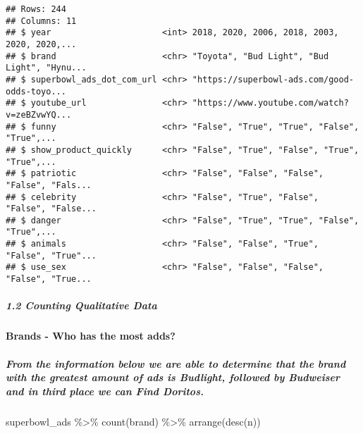 \documentclass[
]{article}
\newenvironment{Shaded}{\begin{snugshade}}{\end{snugshade}}
\newcommand{\FunctionTok}[1]{\textcolor[rgb]{0.00,0.00,0.00}{#1}}
\newcommand{\NormalTok}[1]{#1}
\newcommand{\SpecialCharTok}[1]{\textcolor[rgb]{0.00,0.00,0.00}{#1}}
\begin{document}
\begin{verbatim}
## Rows: 244
## Columns: 11
## $ year                      <int> 2018, 2020, 2006, 2018, 2003, 2020, 2020,...
## $ brand                     <chr> "Toyota", "Bud Light", "Bud Light", "Hynu...
## $ superbowl_ads_dot_com_url <chr> "https://superbowl-ads.com/good-odds-toyo...
## $ youtube_url               <chr> "https://www.youtube.com/watch?v=zeBZvwYQ...
## $ funny                     <chr> "False", "True", "True", "False", "True",...
## $ show_product_quickly      <chr> "False", "True", "False", "True", "True",...
## $ patriotic                 <chr> "False", "False", "False", "False", "Fals...
## $ celebrity                 <chr> "False", "True", "False", "False", "False...
## $ danger                    <chr> "False", "True", "True", "False", "True",...
## $ animals                   <chr> "False", "False", "True", "False", "True"...
## $ use_sex                   <chr> "False", "False", "False", "False", "True...
\end{verbatim}

\hypertarget{counting-qualitative-data}{%
\subparagraph{1.2 Counting Qualitative
Data}\label{counting-qualitative-data}}

\hypertarget{brands---who-has-the-most-adds}{%
\paragraph{Brands - Who has the most
adds?}\label{brands---who-has-the-most-adds}}

\hypertarget{from-the-information-below-we-are-able-to-determine-that-the-brand-with-the-greatest-amount-of-ads-is-budlight-followed-by-budweiser-and-in-third-place-we-can-find-doritos.}{%
\subparagraph{From the information below we are able to determine that
the brand with the greatest amount of ads is Budlight, followed by
Budweiser and in third place we can Find
Doritos.}\label{from-the-information-below-we-are-able-to-determine-that-the-brand-with-the-greatest-amount-of-ads-is-budlight-followed-by-budweiser-and-in-third-place-we-can-find-doritos.}}

\begin{Shaded}
\begin{Highlighting}[]
\NormalTok{ superbowl\_ads }\SpecialCharTok{\%\textgreater{}\%}
  \FunctionTok{count}\NormalTok{(brand) }\SpecialCharTok{\%\textgreater{}\%}
  \FunctionTok{arrange}\NormalTok{(}\FunctionTok{desc}\NormalTok{(n))}
\end{Highlighting}
\end{Shaded}
\end{document}

